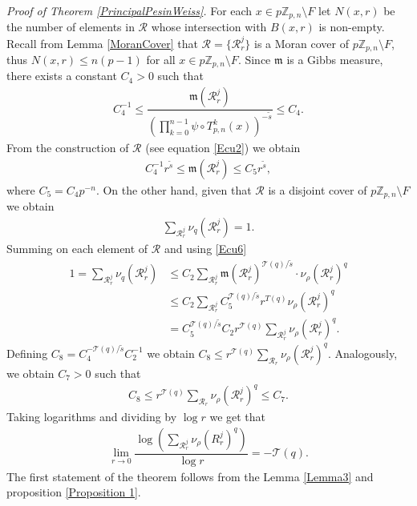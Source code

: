 \documentclass[11pt]{amsart}
\theoremstyle{remark}
\numberwithin{equation}{section}
\newcommand{\Z}{\mathbb{Z}}
\newcommand{\Rcali}{\mathcal{R}}
\begin{document}
 \textit{Proof of Theorem \ref{PrincipalPesinWeiss}.} 
For each $x\in p\Z_{p,n}\setminus F$ let $N(x,r)$ be the number of elements in $\Rcali$ whose intersection with $B(x,r)$ is non-empty. Recall from Lemma \ref{MoranCover} that $\Rcali=\{\Rcali_{r}^{j}\}$ is a Moran cover of $p\Z_{p,n}\setminus F$, thus $N(x,r)\leq n(p-1)$ for all $x\in p\Z_{p,n}\setminus F$. Since $\mathfrak{m}$ is a Gibbs measure, there exists a constant $C_{4}>0$ such that 
    \begin{align*}
        C_{4}^{-1}\leq \dfrac{\mathfrak{m}(\Rcali^{j}_{r})}{\left(\prod^{n-1}_{k=0}\psi\circ T_{p,n}^{k}(x)\right)^{-\tilde{s}}}\leq C_{4}.
    \end{align*}From the construction of $\Rcali$ (see equation \eqref{Ecu2}) we obtain 
    \begin{align}\label{Ecu7}
        C_{4}^{-1}r^{\tilde{s}}\leq \mathfrak{m}(\Rcali^{j}_{r})\leq C_{5}r^{\tilde{s}}, 
    \end{align}where $C_{5}=C_{4}p^{-n}$. On the other hand, given that $\Rcali$ is a disjoint cover of $p\Z_{p,n}\setminus F$ we obtain 
    \begin{align*}
        \sum_{\Rcali_{r}^{j}}\nu_{q}(\Rcali_{r}^{j})=1.
    \end{align*}Summing on each element of $\Rcali$ and using \eqref{Ecu6}
\begin{align*}
    1=\sum_{\Rcali_{r}^{j}}\nu_{q}(\Rcali^{j}_{r})&\leq C_{2}\sum_{\Rcali^{j}_{r}}\mathfrak{m}(\Rcali_{r}^{j})^{\mathcal{T}(q)/\tilde{s}}\cdot \nu_{\rho}(\Rcali^{j}_{r})^{q}\\
    & \leq C_{2} \sum_{\Rcali_{r}^{j}}C_{5}^{\mathcal{T}(q)/\tilde{s}}r^{T(q)}\nu_{\rho}(\Rcali_{r}^{j})^{q}\\
  &  = C_{5}^{\mathcal{T}(q)/\tilde{s}}C_{2}r^{\mathcal{T}(q)}\sum_{\Rcali_{r}^{j}}\nu_{\rho}(\Rcali^{j}_{r})^{q}.
\end{align*}Defining $C_{8}=C_{4}^{-\mathcal{T}(q)/\tilde{s}}C_{2}^{-1}$ we obtain $C_{8}\leq r^{\mathcal{T}(q)}\sum_{\Rcali_{r}}\nu_{\rho}(\Rcali_{r}^{j})^{q}$. Analogously, we obtain $C_{7}>0$ such that
\begin{align*}
    C_{8}\leq r^{\mathcal{T}(q)}\sum_{\Rcali_{r}}\nu_{\rho}(\Rcali_{r}^{j})^{q}\leq C_{7}.
\end{align*}Taking logarithms and dividing by $\log r$ we get that 
\begin{align}\label{Ecuu5}
    \lim_{r\to 0}\dfrac{\log\left(\sum_{\Rcali_{r}^{j}}\nu_{\rho}(R^{j}_{r})^{q}\right)}{\log r}=-\mathcal{T}(q).
\end{align}
The first statement of the theorem follows from the Lemma \ref{Lemma3} and proposition \ref{Proposition 1}. 
\end{document}

